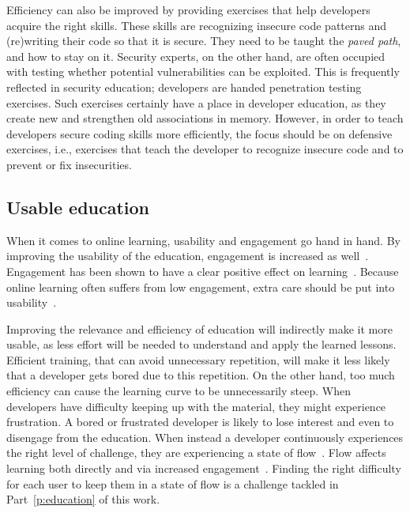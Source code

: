 Efficiency can also be improved by providing exercises that help developers acquire the right skills.
These skills are recognizing insecure code patterns and (re)writing their code so that it is secure.
They need to be taught the \textit{paved path}, and how to stay on it. 
Security experts, on the other hand, are often occupied with testing whether potential vulnerabilities can be exploited. This is frequently reflected in security education; developers are handed penetration testing exercises. Such exercises certainly have a place in developer education, as they create new and strengthen old associations in memory. 
However, in order to teach developers secure coding skills more efficiently, the focus should be on defensive exercises, i.e., exercises that teach the developer to recognize insecure code and to prevent or fix insecurities.

\subsection{Usable education}
When it comes to online learning, usability and engagement go hand in hand. By improving the usability of the education, engagement is increased as well~\cite{garzotto2007investigating,sweetser2005gameflow,febretti2009usability,dahleez2021higher}. 
Engagement has been shown to have a clear positive effect on learning~\cite{hamari2016challenging,dahleez2021higher}.
Because online learning often suffers from low engagement, extra care should be put into usability~\cite{hadi2016driving}.

Improving the relevance and efficiency of education will indirectly make it more usable, as less effort will be needed to understand and apply the learned lessons.
Efficient training, that can avoid unnecessary repetition, will make it less likely that a developer gets bored due to this repetition.
On the other hand, too much efficiency can cause the learning curve to be unnecessarily steep. When developers have difficulty keeping up with the material, they might experience frustration. A bored or frustrated developer is likely to lose interest and even to disengage from the education. When instead a developer continuously experiences the right level of challenge, they are experiencing a state of flow~\cite{joo2012model,csikszentmihalyi2014learning}.
Flow affects learning both directly and via increased engagement~\cite{hamari2016challenging,van2008difficulty,joo2012model}.
Finding the right difficulty for each user to keep them in a state of flow is a challenge tackled in Part~\ref{p:education} of this work.

